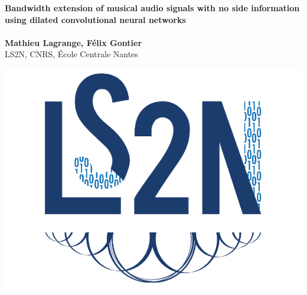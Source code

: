 \documentclass[a0,portrait,20pt]{a0poster}
\begin{document}



\begin{minipage}[b]{0.75\linewidth}
\veryHuge \color{NavyBlue} \textbf{Bandwidth extension of musical audio signals with no side information using dilated convolutional neural networks} \color{Black}\\ %
\Huge\textit{}\\[2cm] %
\huge \textbf{Mathieu Lagrange, F\'elix Gontier}\\[0.5cm] %
\huge LS2N, CNRS, \'Ecole Centrale Nantes\\[0.4cm] %
\end{minipage}
%
\begin{minipage}[b]{0.25\linewidth}
\includegraphics[width=14cm]{figures/logoLs2n.jpg}\\
\end{minipage}

\vspace{1cm} %
\end{document}
